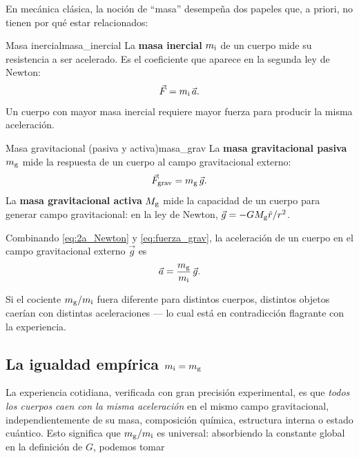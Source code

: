 En mecánica clásica, la noción de ``masa'' desempeña dos papeles que, a priori, no tienen por qué estar relacionados:

\begin{definicion}{Masa inercial}{masa_inercial}
La \textbf{masa inercial} $m_{\rm i}$ de un cuerpo mide su resistencia a ser acelerado. Es el coeficiente que aparece en la segunda ley de Newton:
\begin{equation}
  \vec{F} = m_{\rm i}\,\vec{a}.
  \label{eq:2a_Newton}
\end{equation}
Un cuerpo con mayor masa inercial requiere mayor fuerza para producir la misma aceleración.
\end{definicion}

\begin{definicion}{Masa gravitacional (pasiva y activa)}{masa_grav}
La \textbf{masa gravitacional pasiva} $m_{\rm g}$ mide la respuesta de un cuerpo al campo gravitacional externo:
\begin{equation}
  \vec{F}_{\rm grav} = m_{\rm g}\,\vec{g}.
  \label{eq:fuerza_grav}
\end{equation}
La \textbf{masa gravitacional activa} $M_{\rm g}$ mide la capacidad de un cuerpo para generar campo gravitacional: en la ley de Newton, $\vec{g} = -G M_{\rm g}\hat{r}/r^2$.
\end{definicion}

Combinando \eqref{eq:2a_Newton} y \eqref{eq:fuerza_grav}, la aceleración de un cuerpo en el campo gravitacional externo $\vec{g}$ es
\begin{equation}
  \vec{a} = \frac{m_{\rm g}}{m_{\rm i}}\,\vec{g}.
  \label{eq:aceleracion_caida}
\end{equation}

Si el cociente $m_{\rm g}/m_{\rm i}$ fuera diferente para distintos cuerpos, distintos objetos caerían con distintas aceleraciones — lo cual está en contradicción flagrante con la experiencia.

\subsection{La igualdad empírica \texorpdfstring{$m_{\rm i} = m_{\rm g}$}{mi = mg}}

La experiencia cotidiana, verificada con gran precisión experimental, es que \emph{todos los cuerpos caen con la misma aceleración} en el mismo campo gravitacional, independientemente de su masa, composición química, estructura interna o estado cuántico. Esto significa que $m_{\rm g}/m_{\rm i}$ es universal: absorbiendo la constante global en la definición de $G$, podemos tomar


